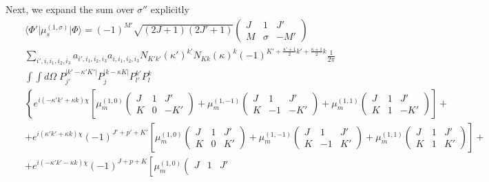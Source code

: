Next, we expand the sum over $\sigma''$ explicitly
\begin{eqnarray}  \nonumber &&
\langle \Phi' \vert \mu^{(1,\sigma)}_s \vert \Phi \rangle = 
(-1)^{M'} \sqrt{(2 J+1)(2 J'+1)} 
\left( \begin{array}{ccc} 
 J &      1 &  J' \\
 M & \sigma & -M'  \end{array} \right)
\\ \nonumber &&
\sum_{i',i,i_1,i_2,i_3} a_{i',i_1,i_2,i_3} a_{i,i_1,i_2,i_3} N_{K'k'} (\kappa')^{k'} N_{Kk} (\kappa)^{k} 
(-1)^{K' + \frac{\kappa' +1}{2} k' + \frac{\kappa +1}{2} k } \frac{1}{2 \pi}
\\ \nonumber &&
\int \int d\Omega \; P^{\vert k' - \kappa' K' \vert}_{j'} P^{\vert k - \kappa K \vert}_{j} 
P^{k'}_{l'}  P^{k}_{l}
\\ \nonumber &&
\left\{ e^{i(- \kappa' k'+ \kappa k) \chi  }
\left[ 
\mu^{(1,0)}_m 
\left( \begin{array}{ccc} 
 J &  1 &  J' \\
 K &  0 & -K'  \end{array} \right) +
\mu^{(1,-1)}_m 
\left( \begin{array}{ccc} 
 J &  1 &  J' \\
 K & -1 & -K'  \end{array} \right) +
\mu^{(1,1)}_m 
\left( \begin{array}{ccc} 
 J &  1 &  J' \\
 K &  1 & -K'  \end{array} \right) \right] \right. +
\\ \nonumber &&
+ e^{i( \kappa' k'+ \kappa k) \chi  } (-1)^{J'+p'+K'} 
\left[ 
\mu^{(1,0)}_m 
\left( \begin{array}{ccc} 
 J &  1 &  J' \\
 K &  0 &  K'  \end{array} \right) +
\mu^{(1,-1)}_m 
\left( \begin{array}{ccc} 
 J &  1 &  J' \\
 K & -1 &  K'  \end{array} \right) +
\mu^{(1,1)}_m 
\left( \begin{array}{ccc} 
 J &  1 &  J' \\
 K &  1 &  K'  \end{array} \right) \right] +
\\ \nonumber &&
+ e^{i(- \kappa' k' - \kappa k) \chi  } (-1)^{J+p+K}
\left[ 
\mu^{(1,0)}_m 
\left( \begin{array}{ccc} 
 J &  1 &  J' \\

\end{array}
\end{eqnarray}
